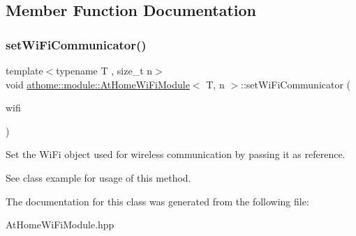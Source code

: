 \subsection{Member Function Documentation}
\mbox{\label{classathome_1_1module_1_1_at_home_wi_fi_module_a610d2e99c11fdd4b6afbfe65ee2e56d5}} 
\subsubsection{\texorpdfstring{set\+Wi\+Fi\+Communicator()}{setWiFiCommunicator()}}
{\footnotesize\ttfamily template$<$typename T , size\+\_\+t n$>$ \\
void \mbox{\hyperlink{classathome_1_1module_1_1_at_home_wi_fi_module}{athome\+::module\+::\+At\+Home\+Wi\+Fi\+Module}}$<$ T, n $>$\+::set\+Wi\+Fi\+Communicator (\begin{DoxyParamCaption}\item[{\mbox{\hyperlink{classathome_1_1communication_1_1wifi_1_1_a_wi_fi_communicator}{communication\+::wifi\+::\+A\+Wi\+Fi\+Communicator}} \&}]{wifi }\end{DoxyParamCaption})\hspace{0.3cm}{\ttfamily [inline]}}

Set the Wi\+Fi object used for wireless communication by passing it as reference.

See class example for usage of this method. 

The documentation for this class was generated from the following file\+:\begin{DoxyCompactItemize}
\item 
At\+Home\+Wi\+Fi\+Module.\+hpp\end{DoxyCompactItemize}
